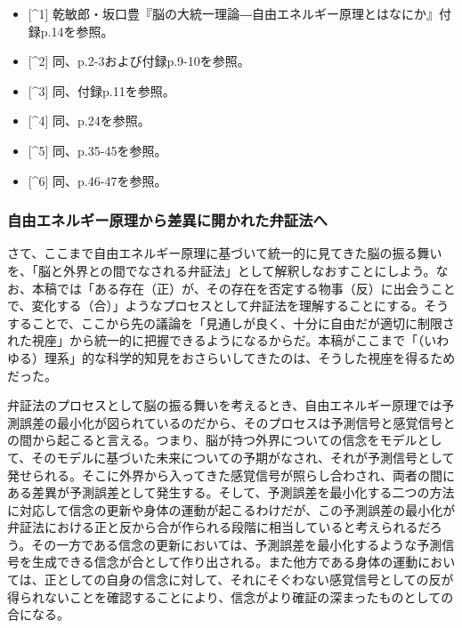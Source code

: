 \begin{itemize}
\tightlist
\item
  {[}\^{}1{]}
  乾敏郎・坂口豊『脳の大統一理論―自由エネルギー原理とはなにか』付録p.14を参照。
\item
  {[}\^{}2{]} 同、p.2-3および付録p.9-10を参照。
\item
  {[}\^{}3{]} 同、付録p.11を参照。
\item
  {[}\^{}4{]} 同、p.24を参照。
\item
  {[}\^{}5{]} 同、p.35-45を参照。
\item
  {[}\^{}6{]} 同、p.46-47を参照。
\end{itemize}

\subsubsection{自由エネルギー原理から差異に開かれた弁証法へ}\label{ux81eaux7531ux30a8ux30cdux30ebux30aeux30fcux539fux7406ux304bux3089ux5deeux7570ux306bux958bux304bux308cux305fux5f01ux8a3cux6cd5ux3078}

さて、ここまで自由エネルギー原理に基づいて統一的に見てきた脳の振る舞いを、「脳と外界との間でなされる弁証法」として解釈しなおすことにしよう。なお、本稿では「ある存在（正）が、その存在を否定する物事（反）に出会うことで、変化する（合）」ようなプロセスとして弁証法を理解することにする。そうすることで、ここから先の議論を「見通しが良く、十分に自由だが適切に制限された視座」から統一的に把握できるようになるからだ。本稿がここまで「（いわゆる）理系」的な科学的知見をおさらいしてきたのは、そうした視座を得るためだった。

弁証法のプロセスとして脳の振る舞いを考えるとき、自由エネルギー原理では予測誤差の最小化が図られているのだから、そのプロセスは予測信号と感覚信号との間から起こると言える。つまり、脳が持つ外界についての信念をモデルとして、そのモデルに基づいた未来についての予期がなされ、それが予測信号として発せられる。そこに外界から入ってきた感覚信号が照らし合わされ、両者の間にある差異が予測誤差として発生する。そして、予測誤差を最小化する二つの方法に対応して信念の更新や身体の運動が起こるわけだが、この予測誤差の最小化が弁証法における正と反から合が作られる段階に相当していると考えられるだろう。その一方である信念の更新においては、予測誤差を最小化するような予測信号を生成できる信念が合として作り出される。また他方である身体の運動においては、正としての自身の信念に対して、それにそぐわない感覚信号としての反が得られないことを確認することにより、信念がより確証の深まったものとしての合になる。

